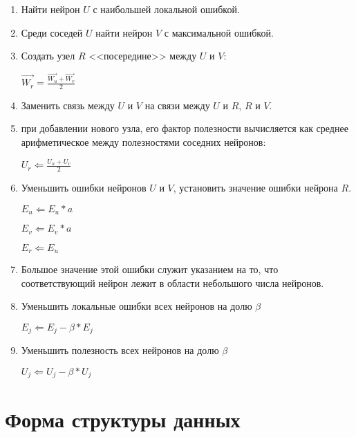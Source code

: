 \documentclass[unicode, 12pt, a4paper,oneside,fleqn]{article}
\begin{document}
\begin{enumerate}
\item \label{gng-u:13} \label{gng:12}
  Найти нейрон $U$ с наибольшей локальной ошибкой.

\item \label{gng-u:14} \label{gng:13}
  Среди соседей $U$ найти нейрон $V$ с максимальной ошибкой.

\item \label{gng-u:15} \label{gng:14}
  Создать узел $R$ <<посередине>> между $U$ и $V$:

  $\vec{W_r}=\frac{\vec{W_u} + \vec{W_v}}{2}$

\item \label{gng-u:16} \label{gng:15}
  Заменить связь между $U$ и $V$ на связи между $U$ и $R$, $R$ и
  $V$.

\item \label{gng-u:17} %
  при добавлении нового узла, его фактор полезности вычисляется как
  среднее арифметическое между полезностями соседних нейронов:

  $U_r \Leftarrow \frac{U_u + U_v}{2}$

\item \label{gng-u:18} \label{gng:16}
  Уменьшить ошибки нейронов $U$ и $V$, установить значение ошибки
  нейрона $R$.

  $E_u \Leftarrow E_u*a$
  
  $E_v \Leftarrow E_v*a$
  
  $E_r \Leftarrow E_u$

\item \label{gng-u:19} \label{gng:17}
  Большое значение этой ошибки служит указанием на то, что
  соответствующий нейрон лежит в области небольшого числа нейронов.

\item \label{gng-u:20} \label{gng:18}
  Уменьшить локальные ошибки всех нейронов на долю $\beta$
  
  $E_j \Leftarrow E_j - \beta*E_j$

\item \label{gng-u:21} %
  Уменьшить полезность всех нейронов на долю $\beta$

  $U_j \Leftarrow U_j - \beta*U_j$

\end{enumerate}



\section{Форма структуры данных}
\end{document}
